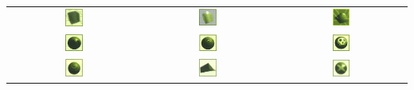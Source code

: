 \documentclass[11pt,twoside,a4paper]{article}
\begin{document}
\begin{multicols*}{2}
\begin{tabular}[ht]{ c c c }
	\includegraphics[width=0.14\textwidth]{img/catalogueProgrammesGlace.jpg}
		&
	\includegraphics[width=0.14\textwidth]{img/catalogueProgrammesAlarme.jpg}
		&
	\includegraphics[width=0.14\textwidth]{img/catalogueProgrammesProcesseur.jpg}
		\\
	\includegraphics[width=0.14\textwidth]{img/catalogueProgrammesTueur01.jpg}
		&
	\includegraphics[width=0.14\textwidth]{img/catalogueProgrammesTueur02.jpg}
		&
	\includegraphics[width=0.14\textwidth]{img/catalogueProgrammesTueur03.jpg}
		\\
	\includegraphics[width=0.14\textwidth]{img/catalogueProgrammesCouleuvre.jpg}
		&
	\includegraphics[width=0.14\textwidth]{img/catalogueProgrammesTraceur.jpg}
		&
	\includegraphics[width=0.14\textwidth]{img/catalogueProgrammesBrouilleur.jpg}
		\\
\end{tabular}


\end{multicols*}
\end{document}
